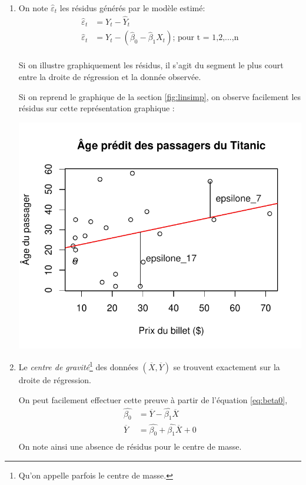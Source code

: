 \documentclass[11pt,french]{report}
\begin{document}
\begin{enumerate}
\item On note $\hat{\varepsilon}_t$ les résidus générés par le modèle estimé:
\begin{align*}
\hat{\varepsilon}_t &= Y_t - \hat{Y}_t \\
\hat{\varepsilon}_t &= Y_t - (\hat{\beta}_0 - \hat{\beta}_1 X_t) \text{; pour t = 1,2,...,n} \\
\end{align*}

Si on illustre graphiquement les résidus, il s'agit du segment le plus court entre la droite de régression et la donnée observée. 

\bigskip
Si on reprend le graphique de la section \ref{fig:linsimp}, on observe facilement les résidus sur cette représentation graphique :

\includegraphics{notes_de_cours-007}

\item Le \emph{centre de gravité}\footnote{Qu'on appelle parfois le centre de masse.} des données $(\overline{X}, \overline{Y})$ se trouvent exactement sur la droite de régression.
\bigskip

On peut facilement effectuer cette preuve à partir de l'équation \ref{eq:beta0},
\begin{align*}
\hat{\beta_0} &= \overline{Y} - \hat{\beta_1} \overline{X} \\
\overline{Y} &=  \hat{\beta_0} + \hat{\beta_1} \overline{X} + 0 \\
\end{align*}
On note ainsi une absence de résidus pour le centre de masse.


\end{enumerate}
\end{document}
